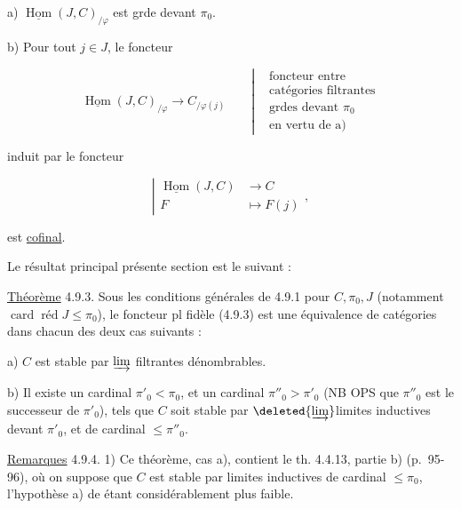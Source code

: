 
a) $\underline{\operatorname{Hom}}(J,C)_{/\varphi}$ est grde devant $\pi_0$.

b) Pour tout $j\in J$, le foncteur

\[
\underline{\operatorname{Hom}}(J,C)_{/\varphi}\longrightarrow C_{/\varphi(j)}\qquad\left|\begin{aligned}&\text{foncteur entre}\\&\text{catégories filtrantes}\\&\text{grdes devant }\pi_0\\&\text{en vertu de a)}\end{aligned}\right.\tag*{(4.9.2.1)}
\]

induit par le foncteur

\[
\left|\begin{aligned}\underline{\operatorname{Hom}}(J,C)&\longrightarrow C\\ F&\longmapsto F(j)\end{aligned}\right.,\tag*{(4.9.2.2)}
\]

est \uline{cofinal}.

Le résultat principal   présente section est le suivant :

\uline{Théorème} 4.9.3. Sous les conditions générales de 4.9.1 pour $C,\pi_0,J$ (notamment $\operatorname{card}\operatorname{réd}J\leq\pi_0$), le foncteur pl fidèle (4.9.3) est une équivalence de catégories dans chacun des deux cas suivants :

a) $C$ est stable par $\varinjlim$ filtrantes dénombrables.


b) Il existe un cardinal $\pi'_0<\pi_0$, et un cardinal $\pi''_0>\pi'_0$ (NB OPS que $\pi''_0$ est le successeur de $\pi'_0$), tels que $C$ soit stable par $\deleted{\varinjlim}$limites inductives  devant $\pi'_0$, et de cardinal $\leq\pi''_0$.

\uline{Remarques} 4.9.4. 1) Ce théorème, cas a), contient le th. 4.4.13, partie b) (p.~95-96), où on suppose que $C$ est stable par limites inductives de cardinal $\leq\pi_0$, l'hypothèse a) de  étant considérablement plus faible.
